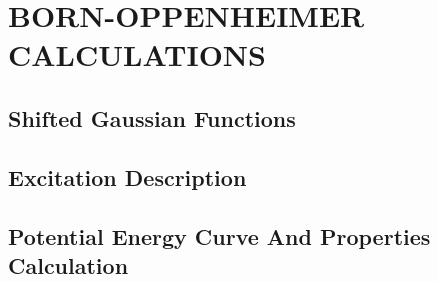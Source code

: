 \chapter{BORN-OPPENHEIMER CALCULATIONS\label{BO}}

\section{Shifted Gaussian Functions}

\section{Excitation Description}

\section{Potential Energy Curve And Properties Calculation}


